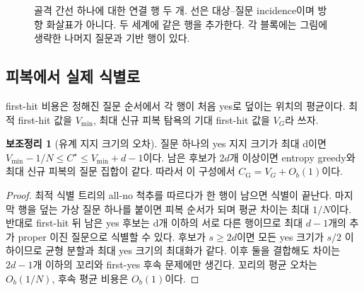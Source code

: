 \documentclass[11pt,a4paper]{article}
\theoremstyle{definition}
\newtheorem{lemma}[theorem]{보조정리}
\theoremstyle{remark}\newtheorem{remark}[theorem]{주석}
\newcommand{\Opt}{C^{\star}}
\newcommand{\Greedy}{C_{\mathrm G}}
\begin{document}
\begin{figure}[htbp]\centering
{}
\caption{골격 간선 하나에 대한 연결 행 두 개. 선은 대상--질문 incidence이며 방향 화살표가 아니다. 두 세계에 같은 행을 추가한다. 각 블록에는 그림에 생략한 나머지 질문과 기반 행이 있다.}\label{fig:lift}
\end{figure}

\subsection{피복에서 실제 식별로}
first-hit 비용은 정해진 질문 순서에서 각 행이 처음 yes로 덮이는 위치의 평균이다. 최적 first-hit 값을 $V_{\min}$, 최대 신규 피복 탐욕의 기대 first-hit 값을 $V_G$라 쓰자.
\begin{lemma}[유계 지지 크기의 오차]\label{lem:bridge}
질문 하나의 yes 지지 크기가 최대 d이면 $V_{\min}-1/N\le\Opt\le V_{\min}+d-1$이다. 남은 후보가 $2d$개 이상이면 entropy greedy와 최대 신규 피복의 질문 집합이 같다. 따라서 이 구성에서 $\Greedy=V_G+O_b(1)$이다.
\end{lemma}
\begin{proof}
최적 식별 트리의 all-no 척추를 따르다가 한 행이 남으면 식별이 끝난다. 마지막 행을 덮는 가상 질문 하나를 붙이면 피복 순서가 되며 평균 차이는 최대 $1/N$이다. 반대로 first-hit 뒤 남은 yes 후보는 d개 이하의 서로 다른 행이므로 최대 $d-1$개의 추가 proper 이진 질문으로 식별할 수 있다. 후보가 $s\ge2d$이면 모든 yes 크기가 $s/2$ 이하이므로 균형 분할과 최대 yes 크기의 최대화가 같다. 이후 둘을 결합해도 차이는 $2d-1$개 이하의 꼬리와 first-yes 후속 문제에만 생긴다. 꼬리의 평균 오차는 $O_b(1/N)$, 후속 평균 비용은 $O_b(1)$이다.
\end{proof}
\end{document}
